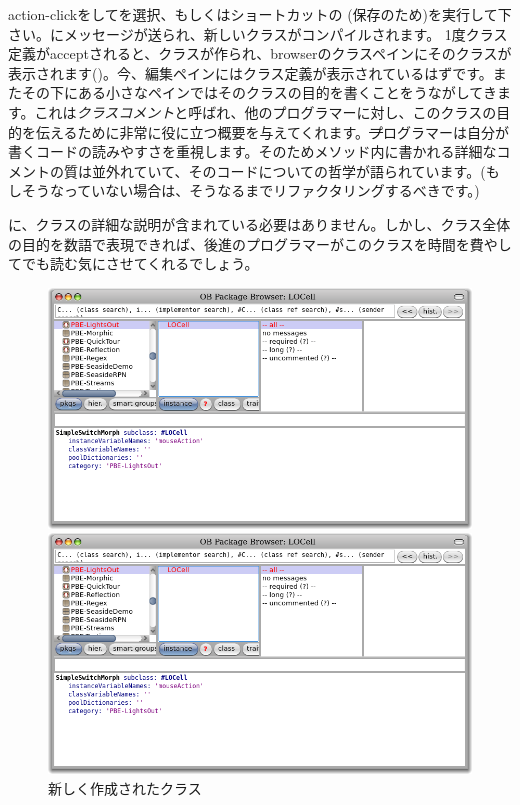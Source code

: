 \documentclass[a4paper,10pt,twoside]{book}
\begin{document}
action-clickをしてを選択、もしくはショートカットの (保存のため)を実行して下さい。にメッセージが送られ、新しいクラスがコンパイルされます。
1度クラス定義がacceptされると、クラスが作られ、browserのクラスペインにそのクラスが表示されます()。今、編集ペインにはクラス定義が表示されているはずです。またその下にある小さなペインではそのクラスの目的を書くことをうながしてきます。これは\emph{クラスコメント}と呼ばれ、他のプログラマーに対し、このクラスの目的を伝えるために非常に役に立つ概要を与えてくれます。\st プログラマーは自分が書くコードの読みやすさを重視します。そのためメソッド内に書かれる詳細なコメントの質は並外れていて、そのコードについての哲学が語られています。(もしそうなっていない場合は、そうなるまでリファクタリングするべきです。)

に、クラスの詳細な説明が含まれている必要はありません。しかし、クラス全体の目的を数語で表現できれば、後進のプログラマーがこのクラスを時間を費やしてでも読む気にさせてくれるでしょう。


\begin{figure}[h!t]
\ifluluelse
	{\centerline {\includegraphics[width=\textwidth]{LOCell}}}
	{\centerline {\includegraphics[scale=0.7]{LOCell}}}
\caption{新しく作成されたクラス }
\end{figure}
\end{document}
